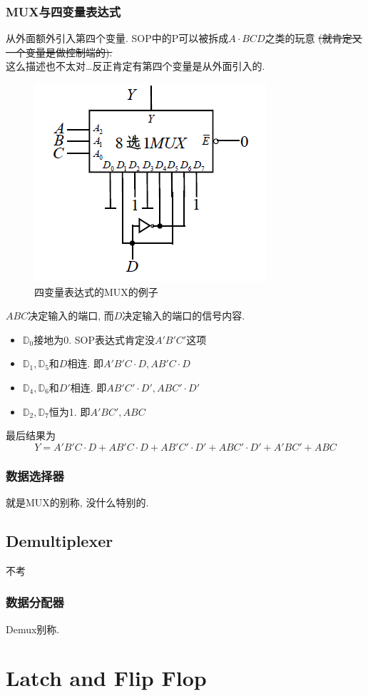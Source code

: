 \documentclass[scheme=chinese,a4paper]{report}
\begin{document}
\subsection{MUX与四变量表达式}
从外面额外引入第四个变量. SOP中的P可以被拆成$A\cdot BCD$之类的玩意\sout{ (就肯定又一个变量是做控制端的).} \\
这么描述也不太对\dots 反正肯定有第四个变量是从外面引入的. 
\begin{figure}[H]
    \centering
    \includegraphics[width=.5\textwidth]{mux_2.png}
    \caption{四变量表达式的MUX的例子}
    \end{figure}
    $ABC$决定输入的端口, 而$D$决定输入的端口的信号内容. 
\begin{itemize}
    \item $\mathbb{D}_0$接地为0. SOP表达式肯定没$A'B'C'$这项
    \item $\mathbb{D}_1,\mathbb{D}_5$和$D$相连. 即$A'B'C\cdot D,AB'C\cdot D$
    \item $\mathbb{D}_4,\mathbb{D}_6$和$D'$相连. 即$AB'C'\cdot D',ABC'\cdot D'$
    \item $\mathbb{D}_2,\mathbb{D}_7$恒为1. 即$A'BC',ABC$
\end{itemize}
最后结果为
$$Y=A'B'C\cdot D+AB'C\cdot D+AB'C'\cdot D'+ABC'\cdot D'+A'BC'+ABC$$


\subsection{数据选择器}
就是MUX的别称, 没什么特别的. 
\section{Demultiplexer}
不考
\subsection{数据分配器}
Demux别称. 

\chapter{Latch and Flip Flop}
\end{document}

